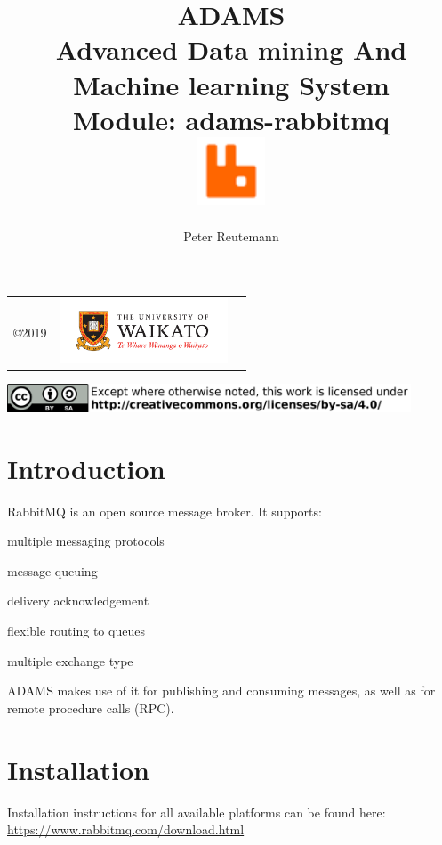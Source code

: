\documentclass[a4paper]{book}
\title{
  \textbf{ADAMS} \\
  {\Large \textbf{A}dvanced \textbf{D}ata mining \textbf{A}nd \textbf{M}achine
  learning \textbf{S}ystem} \\
  {\Large Module: adams-rabbitmq} \\
  \vspace{1cm}
  \includegraphics[width=2cm]{images/rabbitmq-module.png} \\
}
\author{
  Peter Reutemann
}
\begin{document}
\begin{titlepage}
\maketitle

\thispagestyle{empty}
\center
\begin{table}[b]
	\begin{tabular}{c l l}
		\parbox[c][2cm]{2cm}{\copyright 2019} &
		\parbox[c][2cm]{5cm}{\includegraphics[width=5cm]{images/coat_of_arms.pdf}} \\
	\end{tabular}
	\includegraphics[width=12cm]{images/cc.png} \\
\end{table}

\end{titlepage}

\tableofcontents

\chapter{Introduction}
RabbitMQ\cite{rabbitmq} is an open source message broker. It supports:
\begin{tight_itemize}
  \item multiple messaging protocols
  \item message queuing
  \item delivery acknowledgement
  \item flexible routing to queues
  \item multiple exchange type
\end{tight_itemize}
ADAMS makes use of it for publishing and consuming messages, as well as for
remote procedure calls (RPC).

\chapter{Installation}
Installation instructions for all available platforms can be found here: \\
\url{https://www.rabbitmq.com/download.html}{}
\end{document}
